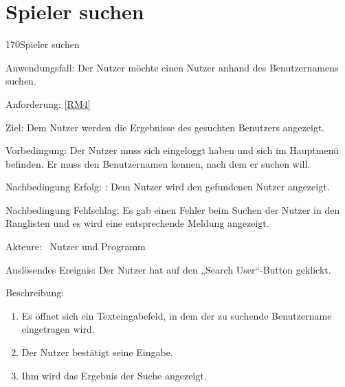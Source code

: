 \section{Spieler suchen}
\begin{function}{170}{Spieler suchen}
\item[Anwendungsfall:] Der Nutzer möchte einen Nutzer anhand des Benutzernamens suchen.
\item[Anforderung:] \ref{RM4}
\item[Ziel:] Dem Nutzer werden die Ergebnisse des gesuchten Benutzers angezeigt.
\item[Vorbedingung:] Der Nutzer muss sich eingeloggt haben und sich im Hauptmenü befinden. Er muss den Benutzernamen kennen, nach dem er suchen will.
\item[Nachbedingung Erfolg:]  : Dem Nutzer wird den gefundenen Nutzer angezeigt.
\item[Nachbedingung Fehlschlag:] Es gab einen Fehler beim Suchen der Nutzer in den Ranglisten und es wird eine entsprechende Meldung angezeigt.
\item[Akteure:] ~Nutzer und Programm
\item[Auslösendes Ereignis:] Der Nutzer hat auf den „Search User“-Button geklickt.
\item[Beschreibung:] ~
\begin{enumerate}
  \item  Es öffnet sich ein Texteingabefeld, in dem der zu suchende Benutzername eingetragen wird.
  \item  Der Nutzer bestätigt seine Eingabe.
  \item  Ihm wird das Ergebnis der Suche angezeigt.
\end{enumerate}
\end{function}

